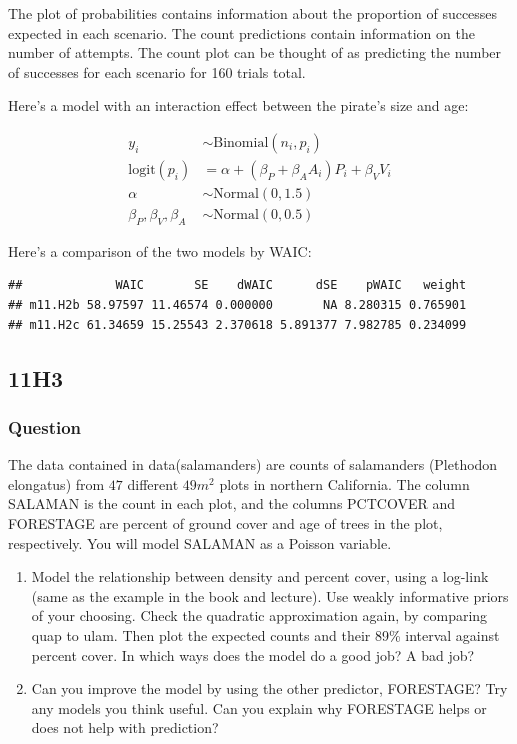 \documentclass[
]{book}
\begin{document}
The plot of probabilities contains information about the proportion of successes expected in each scenario. The count predictions contain information on the number of attempts. The count plot can be thought of as predicting the number of successes for each scenario for 160 trials total.

Here's a model with an interaction effect between the pirate's size and age:

\[
\begin{aligned}
y_i &\sim \text{Binomial}(n_i,p_i) \\
\text{logit}(p_i) &=  \alpha + (\beta_P + \beta_A A_i)P_i + \beta_V V_i  \\
\alpha &\sim \text{Normal}(0,1.5) \\
\beta_P, \beta_V, \beta_A &\sim \text{Normal}(0,0.5) 
\end{aligned}
\]

Here's a comparison of the two models by WAIC:

\begin{verbatim}
##             WAIC       SE    dWAIC      dSE    pWAIC   weight
## m11.H2b 58.97597 11.46574 0.000000       NA 8.280315 0.765901
## m11.H2c 61.34659 15.25543 2.370618 5.891377 7.982785 0.234099
\end{verbatim}

\hypertarget{h3-4}{%
\subsection*{11H3}\label{h3-4}}

\hypertarget{question-95}{%
\subsubsection*{Question}\label{question-95}}

The data contained in data(salamanders) are counts of salamanders (Plethodon elongatus) from \(47\) different \(49m^2\) plots in northern California. The column SALAMAN is the count in each plot, and the columns PCTCOVER and FORESTAGE are percent of ground cover and age of trees in the plot, respectively. You will model SALAMAN as a Poisson variable.

\begin{enumerate}
\def\labelenumi{(\alph{enumi})}
\item
  Model the relationship between density and percent cover, using a log-link (same as the example in the book and lecture). Use weakly informative priors of your choosing. Check the quadratic approximation again, by comparing quap to ulam. Then plot the expected counts and their 89\% interval against percent cover. In which ways does the model do a good job? A bad job?
\item
  Can you improve the model by using the other predictor, FORESTAGE? Try any models you think useful. Can you explain why FORESTAGE helps or does not help with prediction?
\end{enumerate}
\end{document}
